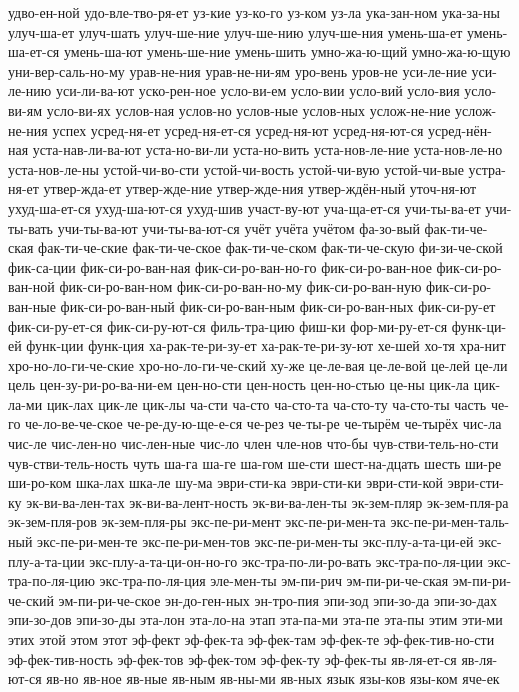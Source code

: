 {удво-ен-ной
удо-вле-тво-ря-ет
уз-кие
уз-ко-го
уз-ком
уз-ла
ука-зан-ном
ука-за-ны
улуч-ша-ет
улуч-шать
улуч-ше-ние
улуч-ше-нию
улуч-ше-ния
умень-ша-ет
умень-ша-ет-ся
умень-ша-ют
умень-ше-ние
умень-шить
умно-жа-ю-щий
умно-жа-ю-щую
уни-вер-саль-но-му
урав-не-ния
урав-не-ни-ям
уро-вень
уров-не
уси-ле-ние
уси-ле-нию
уси-ли-ва-ют
уско-рен-ное
усло-ви-ем
усло-вии
усло-вий
усло-вия
усло-ви-ям
усло-ви-ях
услов-ная
услов-но
услов-ные
услов-ных
услож-не-ние
услож-не-ния
успех
усред-ня-ет
усред-ня-ет-ся
усред-ня-ют
усред-ня-ют-ся
усред-нён-ная
уста-нав-ли-ва-ют
уста-но-ви-ли
уста-но-вить
уста-нов-ле-ние
уста-нов-ле-но
уста-нов-ле-ны
устой-чи-во-сти
устой-чи-вость
устой-чи-вую
устой-чи-вые
устра-ня-ет
утвер-жда-ет
утвер-жде-ние
утвер-жде-ния
утвер-ждён-ный
уточ-ня-ют
ухуд-ша-ет-ся
ухуд-ша-ют-ся
ухуд-шив
участ-ву-ют
уча-ща-ет-ся
учи-ты-ва-ет
учи-ты-вать
учи-ты-ва-ют
учи-ты-ва-ют-ся
учёт
учёта
учётом
фа-зо-вый
фак-ти-че-ская
фак-ти-че-ские
фак-ти-че-ское
фак-ти-че-ском
фак-ти-че-скую
фи-зи-че-ской
фик-са-ции
фик-си-ро-ван-ная
фик-си-ро-ван-но-го
фик-си-ро-ван-ное
фик-си-ро-ван-ной
фик-си-ро-ван-ном
фик-си-ро-ван-но-му
фик-си-ро-ван-ную
фик-си-ро-ван-ные
фик-си-ро-ван-ный
фик-си-ро-ван-ным
фик-си-ро-ван-ных
фик-си-ру-ет
фик-си-ру-ет-ся
фик-си-ру-ют-ся
филь-тра-цию
фиш-ки
фор-ми-ру-ет-ся
функ-ци-ей
функ-ции
функ-ция
ха-рак-те-ри-зу-ет
ха-рак-те-ри-зу-ют
хе-шей
хо-тя
хра-нит
хро-но-ло-ги-че-ские
хро-но-ло-ги-че-ский
ху-же
це-ле-вая
це-ле-вой
це-лей
це-ли
цель
цен-зу-ри-ро-ва-ни-ем
цен-но-сти
цен-ность
цен-но-стью
це-ны
цик-ла
цик-ла-ми
цик-лах
цик-ле
цик-лы
ча-сти
ча-сто
ча-сто-та
ча-сто-ту
ча-сто-ты
часть
че-го
че-ло-ве-че-ское
че-ре-ду-ю-ще-е-ся
че-рез
че-ты-ре
че-тырём
че-тырёх
чис-ла
чис-ле
чис-лен-но
чис-лен-ные
чис-ло
член
чле-нов
что-бы
чув-стви-тель-но-сти
чув-стви-тель-ность
чуть
ша-га
ша-ге
ша-гом
ше-сти
шест-на-дцать
шесть
ши-ре
ши-ро-ком
шка-лах
шка-ле
шу-ма
эври-сти-ка
эври-сти-ки
эври-сти-кой
эври-сти-ку
эк-ви-ва-лен-тах
эк-ви-ва-лент-ность
эк-ви-ва-лен-ты
эк-зем-пляр
эк-зем-пля-ра
эк-зем-пля-ров
эк-зем-пля-ры
экс-пе-ри-мент
экс-пе-ри-мен-та
экс-пе-ри-мен-таль-ный
экс-пе-ри-мен-те
экс-пе-ри-мен-тов
экс-пе-ри-мен-ты
экс-плу-а-та-ци-ей
экс-плу-а-та-ции
экс-плу-а-та-ци-он-но-го
экс-тра-по-ли-ро-вать
экс-тра-по-ля-ции
экс-тра-по-ля-цию
экс-тра-по-ля-ция
эле-мен-ты
эм-пи-рич
эм-пи-ри-че-ская
эм-пи-ри-че-ский
эм-пи-ри-че-ское
эн-до-ген-ных
эн-тро-пия
эпи-зод
эпи-зо-да
эпи-зо-дах
эпи-зо-дов
эпи-зо-ды
эта-лон
эта-ло-на
этап
эта-па-ми
эта-пе
эта-пы
этим
эти-ми
этих
этой
этом
этот
эф-фект
эф-фек-та
эф-фек-там
эф-фек-те
эф-фек-тив-но-сти
эф-фек-тив-ность
эф-фек-тов
эф-фек-том
эф-фек-ту
эф-фек-ты
яв-ля-ет-ся
яв-ля-ют-ся
яв-но
яв-ное
яв-ные
яв-ным
яв-ны-ми
яв-ных
язык
язы-ков
язы-ком
яче-ек
}
